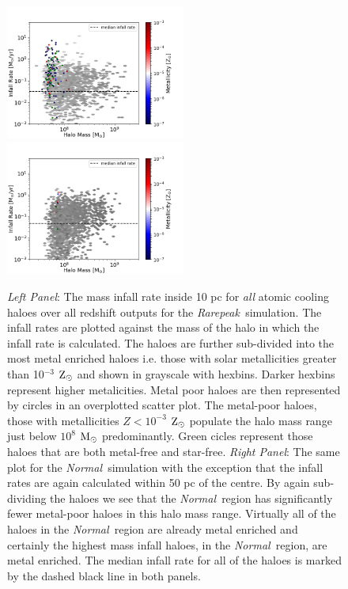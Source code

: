 \documentclass[graphics, twocolumn, usenatbib]{mn2e}
\newcommand{\msolar} {$\rm{M_{\odot}}~$}
\newcommand{\zsolar} {$\rm{Z_{\odot}}~$}
\newcommand{\rarepeak} {\textit{Rarepeak~}}
\newcommand{\normal} {\textit{Normal~}}
\begin{document}
\begin{figure}
\centering
\begin{minipage}{175mm}      \begin{center} 
\centerline{
\includegraphics[width=0.525\textwidth]{FIGURES/Rarepeak_MdotMHaloZ_Hexbin.png}
\includegraphics[width=0.525\textwidth]{FIGURES/Normal_MdotMHaloZ_Hexbin.png}}
\caption{\textit{Left Panel}: The mass infall rate inside 10 pc for \textit{all} atomic
  cooling haloes over all redshift outputs for the \rarepeak simulation. The infall rates
  are plotted against the mass of the halo in which the infall rate is
  calculated. The haloes are further sub-divided into the most metal enriched haloes
  i.e. those with solar metallicities greater than 10$^{-3}$ \zsolar and shown in grayscale with
  hexbins. Darker hexbins represent higher metalicities. Metal poor haloes are then represented
  by circles in an overplotted scatter plot. The metal-poor haloes, those with metallicities
  $Z < 10^{-3}$ \zsolar populate the halo mass range just below $10^{8}$ \msolar predominantly.
  Green cicles represent those haloes that are both metal-free and star-free. 
  \textit{Right Panel}: The same plot for the \normal simulation with the exception that the infall
  rates are again calculated within 50 pc of the centre. By again sub-dividing the haloes we see
  that the \normal region has significantly fewer metal-poor haloes in this halo mass range.
  Virtually all of the haloes in the \normal region are already metal enriched and certainly the
  highest mass infall haloes, in the \normal region, are metal enriched. 
  The median infall rate for all of the haloes is marked by the dashed black line in both panels.}
\label{Fig:HaloMass}
\end{center} \end{minipage}

\end{figure}
\end{document}
